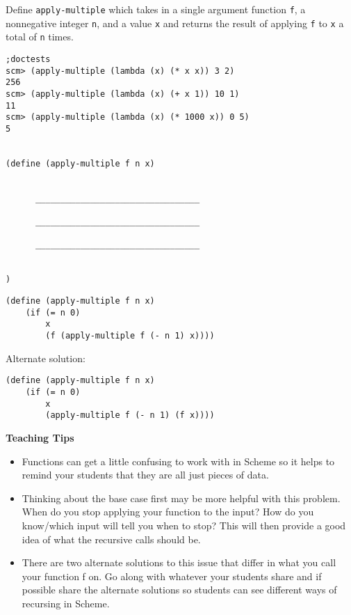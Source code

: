 \begin{blocksection}
\question Define \lstinline{apply-multiple} which takes in a single argument function \lstinline{f}, 
a nonnegative integer \lstinline{n}, and a value \lstinline{x} and returns the result of applying 
\lstinline{f} to \lstinline{x} a total of \lstinline{n} times.

\begin{lstlisting}
;doctests
scm> (apply-multiple (lambda (x) (* x x)) 3 2)
256
scm> (apply-multiple (lambda (x) (+ x 1)) 10 1)
11
scm> (apply-multiple (lambda (x) (* 1000 x)) 0 5)
5


(define (apply-multiple f n x)


	  _________________________________
	  
	  _________________________________
	  
	  _________________________________
	  

)
\end{lstlisting}
\begin{solution}
\begin{lstlisting}
(define (apply-multiple f n x)
    (if (= n 0)
        x
        (f (apply-multiple f (- n 1) x))))
\end{lstlisting}

Alternate solution:

\begin{lstlisting}
(define (apply-multiple f n x)
    (if (= n 0)
        x
        (apply-multiple f (- n 1) (f x))))
\end{lstlisting}
\end{solution}
\end{blocksection}

\begin{blocksection}
\begin{guide}
\textbf{Teaching Tips}
\begin{itemize}
	\item Functions can get a little confusing to work with in Scheme so it helps to remind your students that they are all just pieces of data.
	\item Thinking about the base case first may be more helpful with this problem. When do you stop applying your function to the input? How do you know/which input will tell you when to stop? This will then provide a good idea of what the recursive calls should be.
	\item There are two alternate solutions to this issue that differ in what you call your function f on. Go along with whatever your students share and if possible share the alternate solutions so students can see different ways of recursing in Scheme.
\end{itemize}
\end{guide}
\end{blocksection}